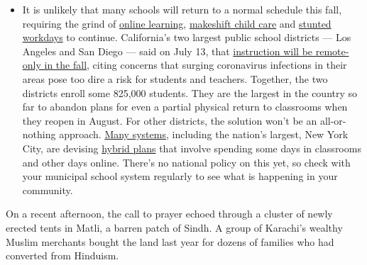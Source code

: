 \begin{itemize}
  \begin{itemize}
  \tightlist
  \item
    It is unlikely that many schools will return to a normal schedule
    this fall, requiring the grind of
    \href{https://www.nytimes.com/2020/06/05/us/coronavirus-education-lost-learning.html?action=click\&pgtype=Article\&state=default\&region=MAIN_CONTENT_3\&context=storylines_faq}{online
    learning},
    \href{https://www.nytimes.com/2020/05/29/us/coronavirus-child-care-centers.html?action=click\&pgtype=Article\&state=default\&region=MAIN_CONTENT_3\&context=storylines_faq}{makeshift
    child care} and
    \href{https://www.nytimes.com/2020/06/03/business/economy/coronavirus-working-women.html?action=click\&pgtype=Article\&state=default\&region=MAIN_CONTENT_3\&context=storylines_faq}{stunted
    workdays} to continue. California's two largest public school
    districts --- Los Angeles and San Diego --- said on July 13, that
    \href{https://www.nytimes.com/2020/07/13/us/lausd-san-diego-school-reopening.html?action=click\&pgtype=Article\&state=default\&region=MAIN_CONTENT_3\&context=storylines_faq}{instruction
    will be remote-only in the fall}, citing concerns that surging
    coronavirus infections in their areas pose too dire a risk for
    students and teachers. Together, the two districts enroll some
    825,000 students. They are the largest in the country so far to
    abandon plans for even a partial physical return to classrooms when
    they reopen in August. For other districts, the solution won't be an
    all-or-nothing approach.
    \href{https://bioethics.jhu.edu/research-and-outreach/projects/eschool-initiative/school-policy-tracker/}{Many
    systems}, including the nation's largest, New York City, are
    devising
    \href{https://www.nytimes.com/2020/06/26/us/coronavirus-schools-reopen-fall.html?action=click\&pgtype=Article\&state=default\&region=MAIN_CONTENT_3\&context=storylines_faq}{hybrid
    plans} that involve spending some days in classrooms and other days
    online. There's no national policy on this yet, so check with your
    municipal school system regularly to see what is happening in your
    community.
  \end{itemize}
\end{itemize}

On a recent afternoon, the call to prayer echoed through a cluster of
newly erected tents in Matli, a barren patch of Sindh. A group of
Karachi's wealthy Muslim merchants bought the land last year for dozens
of families who had converted from Hinduism.


